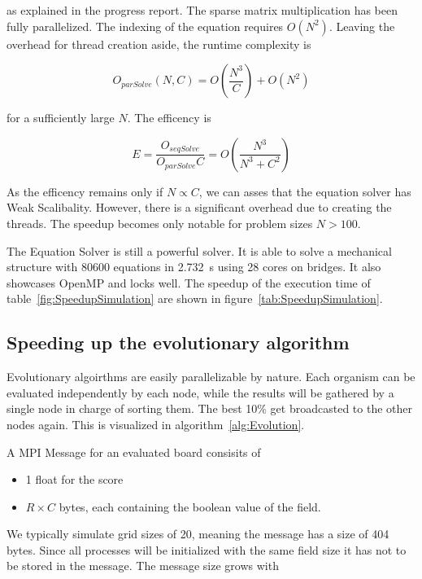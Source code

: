 \documentclass[12pt]{article}
\begin{document}
as explained in the progress report. The sparse matrix multiplication has been fully parallelized. The indexing of the equation requires $O(N^2)$. Leaving the overhead for thread creation aside, the runtime complexity is 

\begin{equation}
    O_\mathit{parSolve}(N, C) = O \left(\frac{N^3}{C}\right) + O(N^2)
\end{equation}

for a sufficiently large $N$. The efficency is

\begin{equation}
    E = \frac{O_\mathit{seqSolve}}{O_\mathit{parSolve} C} = O\left(\frac{N^3}{N^3 + C^2}\right)
\end{equation}

As the efficency remains only if $N \propto C$, we can asses that the equation solver has Weak Scalibality. However, there is a significant overhead due to creating the threads. The speedup becomes only notable for problem sizes $N > 100$.

The Equation Solver is still a powerful solver. It is able to solve a mechanical structure with 80600 equations in \SI{2.732}{\second} using 28 cores on bridges. It also showcases OpenMP and locks well. The speedup of the execution time of table~\ref{fig:SpeedupSimulation} are shown in figure~\ref{tab:SpeedupSimulation}.

\subsection{Speeding up the evolutionary algorithm}

Evolutionary algoirthms are easily parallelizable by nature. Each organism can be evaluated independently by each node, while the results will be gathered by a single node in charge of sorting them. The best 10\% get broadcasted to the other nodes again. This is visualized in algorithm~\ref{alg:Evolution}.

A MPI Message for an evaluated board consisits of

\begin{itemize}
    \item 1 float for the score
    \item $R \times C$ bytes, each containing the boolean value of the field.
\end{itemize}

We typically simulate grid sizes of 20, meaning the message has a size of 404 bytes. Since all processes will be initialized with the same field size it has not to be stored in the message. The message size grows with 
\end{document}
